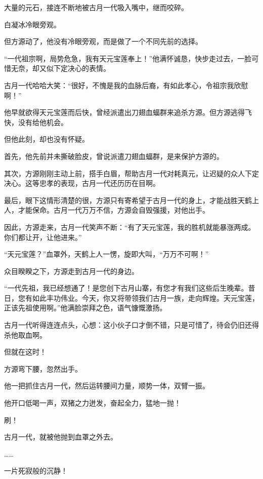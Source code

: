 
\begin{this_body}

大量的元石，接连不断地被古月一代吸入嘴中，继而咬碎。

白凝冰冷眼旁观。

但方源动了，他没有冷眼旁观，而是做了一个不同先前的选择。

“一代祖宗啊，局势危急，我有天元宝莲奉上！”他满怀诚恳，快步走过去，一脸可惜无奈，却又似下定决心的表情。

古月一代哈哈大笑：“很好，不愧是我的血脉后裔，有如此孝心，令祖宗我欣慰啊！”

他早就欲得天元宝莲而后快，曾经派遣出刀翅血蝠群来追杀方源。但方源逃得飞快，没有给他机会。

但他此刻，却也没有怀疑。

首先，他先前并未撕破脸皮，曾说派遣刀翅血蝠群，是来保护方源的。

其次，方源刚刚主动上前，搭手白眉，帮助古月一代对耗真元，让迟疑的众人下定决心。这等忠孝的表现，古月一代还历历在目啊。

最后，眼下这情形清楚的很，方源只有寄希望于古月一代的身上，才能战胜天鹤上人，才能保命。古月一代万万不信，方源会自毁强援，对他出手。

因此，方源走来，古月一代笑声不断：“有了天元宝莲，我的胜机就能暴涨两成。你们都让开，让他进来。”

“天元宝莲？”血罩外，天鹤上人一愣，旋即大叫，“万万不可啊！”

众目睽睽之下，方源走到古月一代的身边。

“一代先祖，我已经想通了！是您创下古月山寨，有您才有我们这些后生晚辈。昔日，您有如此丰功伟业。今天，你又将带领我们古月一族，走向辉煌。天元宝莲，正该先祖使用啊。”他满脸崇拜之色，语气慷慨激扬。

古月一代听得连连点头，心想：这小伙子口才倒不错，只是可惜了，待会仍旧还得杀他取血啊。

但就在这时！

方源弯下腰，忽然出手。

他一把抓住古月一代，然后运转腰间力量，顺势一体，双臂一振。

他开口低喝一声，双猪之力迸发，奋起全力，猛地一抛！

刷！

古月一代，就被他抛到血罩之外去。

……

一片死寂般的沉静！


\end{this_body}
